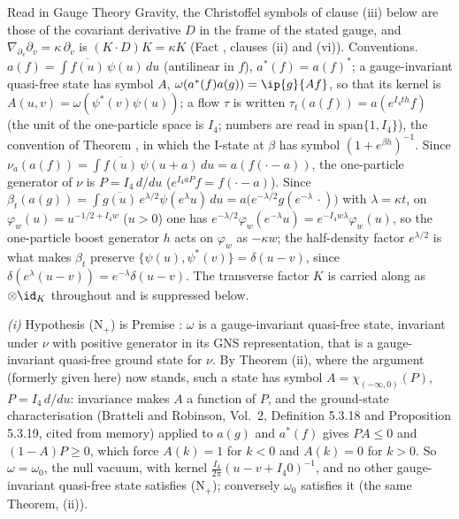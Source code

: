 Read in Gauge Theory Gravity, the Christoffel symbols of clause (iii) below are those of the covariant derivative $D$ in the frame of the stated gauge, and $\nabla_{\partial_v}\partial_v = \kappa\,\partial_v$ is $(K \cdot D)K = \kappa K$ (Fact , clauses (ii) and (vi)). Conventions. $a(f) = \int \overline{f(u)}\,\psi(u)\,du$ (antilinear in $f$), $a^{*}(f) = a(f)^{*}$; a gauge-invariant quasi-free state has symbol $A$, $\omega(a^{*}(f)a(g)) = \ip{g}{Af}$, so that its kernel is $A(u, v) = \omega(\psi^{*}(v)\psi(u))$; a flow $\tau$ is written $\tau_{t}(a(f)) = a(e^{I_{4}th}f)$ (the unit of the one-particle space is $I_{4}$; numbers are read in $\mathrm{span}\{1, I_{4}\}$), the convention of Theorem , in which the I-state at $\beta$ has symbol $(1 + e^{\beta h})^{-1}$. Since $\nu_{a}(a(f)) = \int\overline{f(u)}\,\psi(u + a)\,du = a(f(\cdot - a))$, the one-particle generator of $\nu$ is $P = I_{4}\,d/du$ ($e^{I_{4}aP}f = f(\cdot - a)$). Since $\beta_{t}(a(g)) = \int\overline{g(u)}\,e^{\lambda/2}\psi(e^{\lambda}u)\,du = a\bigl(e^{-\lambda/2}g(e^{-\lambda}\,\cdot)\bigr)$ with $\lambda = \kappa t$, on $\varphi_{w}(u) = u^{-1/2 + I_{4}w}$ ($u > 0$) one has $e^{-\lambda/2}\varphi_{w}(e^{-\lambda}u) = e^{-I_{4}w\lambda}\varphi_{w}(u)$, so the one-particle boost generator $h$ acts on $\varphi_{w}$ as $-\kappa w$; the half-density factor $e^{\lambda/2}$ is what makes $\beta_{t}$ preserve $\{\psi(u), \psi^{*}(v)\} = \delta(u - v)$, since $\delta(e^{\lambda}(u - v)) = e^{-\lambda}\delta(u - v)$. The transverse factor $K$ is carried along as $\otimes\id_{K}$ throughout and is suppressed below.

\emph{(i)} Hypothesis (N$_{+}$) is Premise : $\omega$ is a gauge-invariant quasi-free state, invariant under $\nu$ with positive generator in its GNS representation, that is a gauge-invariant quasi-free ground state for $\nu$. By Theorem (ii), where the argument (formerly given here) now stands, such a state has symbol $A = \chi_{(-\infty,0)}(P)$, $P = I_{4}\,d/du$: invariance makes $A$ a function of $P$, and the ground-state characterisation (Bratteli and Robinson, Vol.~2, Definition 5.3.18 and Proposition 5.3.19, cited from memory) applied to $a(g)$ and $a^{*}(f)$ gives $PA \le 0$ and $(1 - A)P \ge 0$, which force $A(k) = 1$ for $k < 0$ and $A(k) = 0$ for $k > 0$. So $\omega = \omega_{0}$, the null vacuum, with kernel $\tfrac{I_{4}}{2\pi}(u - v + I_{4}0)^{-1}$, and no other gauge-invariant quasi-free state satisfies (N$_{+}$); conversely $\omega_{0}$ satisfies it (the same Theorem, (ii)).


